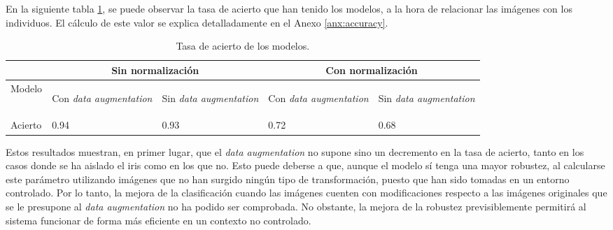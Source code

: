 En la siguiente tabla \ref{tabla:tasa-acierto-modelos}, se puede observar la tasa de acierto que han tenido los modelos, a la hora de relacionar las imágenes
 con los individuos. El cálculo de este valor se explica detalladamente en el Anexo \ref{anx:accuracy}.

\begin{table}[h!]
\begin{tabular}{ |p{1.2cm}||p{2.3cm}|p{2.3cm}|p{2.3cm}|p{2.3cm}|  }
    \hline
     & \multicolumn{2}{|c|}{Sin normalización} & \multicolumn{2}{|c|}{Con normalización} \\
    \hline
    Modelo& \begin{footnotesize}Con \textit{data \newline augmentation}\end{footnotesize} & \begin{footnotesize}Sin \textit{data \newline augmentation}\end{footnotesize} & \begin{footnotesize}Con \textit{data \newline augmentation}\end{footnotesize}& \begin{footnotesize}Sin \textit{data \newline augmentation}\end{footnotesize}\\
    \hline
    Acierto & 0.94   & 0.93    & 0.72 &   0.68\\
    \hline
   \end{tabular}
   \caption{\label{tabla:tasa-acierto-modelos}Tasa de acierto de los modelos.}
\end{table}


Estos resultados muestran, en primer lugar, que el \textit{data augmentation} no supone sino un decremento en la tasa de acierto, tanto en los casos donde se ha aislado el iris
como en los que no. Esto puede deberse a que, aunque el modelo sí tenga una mayor robustez, al calcularse este parámetro utilizando imágenes que no han surgido ningún tipo de transformación, puesto que han sido tomadas en un entorno controlado.
Por lo tanto, la mejora de la clasificación cuando las imágenes cuenten con modificaciones respecto a las imágenes originales que se le presupone al \textit{data augmentation} no ha podido ser comprobada. No obstante, la mejora de la robustez previsiblemente
permitirá al sistema funcionar de forma más eficiente en un contexto no controlado.

